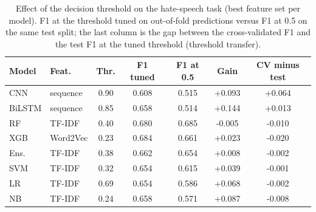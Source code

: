 \begin{table}[t]
\centering
\caption{Effect of the decision threshold on the hate-speech task (best feature set per model). F1 at the threshold tuned on out-of-fold predictions versus F1 at 0.5 on the same test split; the last column is the gap between the cross-validated F1 and the test F1 at the tuned threshold (threshold transfer).}
\label{tab:threshold}
\footnotesize\setlength{\tabcolsep}{3pt}
\begin{tabular}{llccccc}
\toprule
Model & Feat. & Thr. & F1 tuned & F1 at 0.5 & Gain & CV minus test \\
\midrule
CNN & sequence & 0.90 & 0.608 & 0.515 & +0.093 & +0.064 \\
BiLSTM & sequence & 0.85 & 0.658 & 0.514 & +0.144 & +0.013 \\
RF & TF-IDF & 0.40 & 0.680 & 0.685 & -0.005 & -0.010 \\
XGB & Word2Vec & 0.23 & 0.684 & 0.661 & +0.023 & -0.020 \\
Ens. & TF-IDF & 0.38 & 0.662 & 0.654 & +0.008 & -0.002 \\
SVM & TF-IDF & 0.32 & 0.654 & 0.615 & +0.039 & -0.001 \\
LR & TF-IDF & 0.69 & 0.654 & 0.586 & +0.068 & -0.002 \\
NB & TF-IDF & 0.24 & 0.658 & 0.571 & +0.087 & -0.008 \\
\bottomrule
\end{tabular}
\end{table}